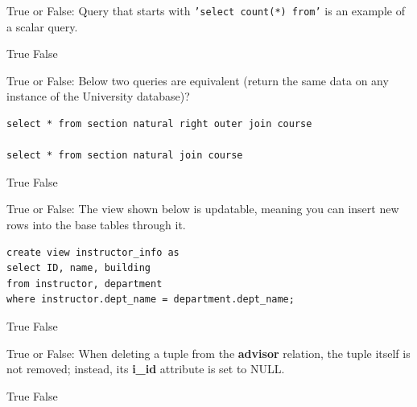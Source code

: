 \documentclass[12pt, addpoints]{exam}
\begin{document}
\begin{questions}
\begin{minipage}{\linewidth}
\question[2]
True or False: Query that starts with \texttt{'select count(*) from'} is an example of a scalar query.\par\vspace{0.5em}
\begin{checkboxes}
    \choice True
    \CorrectChoice False
\end{checkboxes}
\end{minipage}

\begin{minipage}{\linewidth}
\question[2]
True or False: Below two queries are equivalent (return the same data on any instance of the University database)?\par\vspace{0.5em}
\begin{verbatim}
select * from section natural right outer join course

select * from section natural join course
\end{verbatim}
\begin{checkboxes}
    \choice True
    \CorrectChoice False
\end{checkboxes}
\end{minipage}

\begin{minipage}{\linewidth}
\question[2]
True or False: The view shown below is updatable, meaning you can insert new rows into the base tables through it.\par\vspace{0.5em}
\begin{verbatim}
create view instructor_info as 
select ID, name, building 
from instructor, department 
where instructor.dept_name = department.dept_name;
\end{verbatim}
\begin{checkboxes}
    \choice True
    \CorrectChoice False
\end{checkboxes}
\end{minipage}

\begin{minipage}{\linewidth}
\question[2]
True or False: When deleting a tuple from the \textbf{advisor} relation, the tuple itself is not removed; instead, its \textbf{i\_id} attribute is set to NULL.\par\vspace{0.5em}
\begin{checkboxes}
    \choice True
    \CorrectChoice False
\end{checkboxes}
\end{minipage}


\end{questions}
\end{document}
